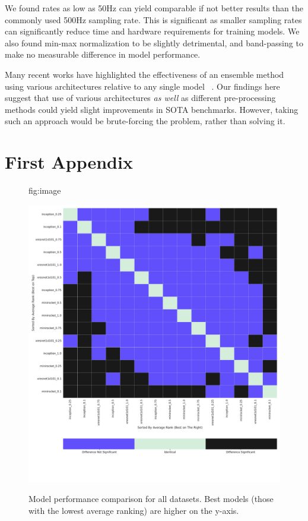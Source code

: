 \documentclass[pmlr,twocolumn]{jmlr}%
\begin{document}
We found rates as low as 50Hz can yield comparable if not better results than the commonly used 500Hz sampling rate. This is significant as smaller sampling rates can significantly reduce time and hardware requirements for training models. We also found min-max normalization to be slightly detrimental, and band-passing to make no measurable difference in model performance.

Many recent works have highlighted the effectiveness of an ensemble method using various architectures relative to any single model ~\citep{uwaechia2021comprehensive,hong2022practical,IsmailFawaz2018deep,strodthoff2020deep,chen2020detection}. Our findings here suggest that use of various architectures \textit{as well} as different pre-processing methods could yield slight improvements in SOTA benchmarks. However, taking such an approach would be brute-forcing the problem, rather than solving it. 



\appendix
\section{First Appendix}\label{apd:model_vs_model}
\begin{figure}[tbp]
\floatconts
  {fig:image}
  {\caption{Model performance comparison for all datasets. Best models (those with the lowest average ranking) are higher on the y-axis.}}
  {\includegraphics[width=1\linewidth]{images/model_comparisons_alldatasets.pdf}}
 
\end{figure}
\end{document}
